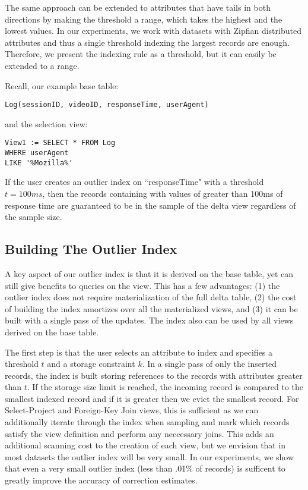 The same approach can be extended to attributes that have tails in both directions by making the threshold a range, which takes the highest and the lowest
values.
In our experiments, we work with datasets with Zipfian distributed attributes and thus a single threshold indexing the largest records are enough.
Therefore, we present the indexing rule as a threshold, but it can easily be extended to a range.

Recall, our example base table:
\begin{lstlisting}
Log(sessionID, videoID, responseTime, userAgent)
\end{lstlisting}
and the selection view:
\begin{lstlisting}
View1 := SELECT * FROM Log 
WHERE userAgent 
LIKE '%Mozilla%'
\end{lstlisting}
If the user creates an outlier index on ``responseTime" with a threshold $t=100ms$, then
the records containing with values of greater than 100ms of response time are guaranteed to be 
in the sample of the delta view regardless of the sample size.

\subsection{Building The Outlier Index}
A key aspect of our outlier index is that it is derived on the base table, yet 
can still give benefits to queries on the view.
This has a few advantages: (1) the outlier index does not require materialization of the full delta table,
(2) the cost of building the index amortizes over all the materialized views, and (3) it can be built with a 
single pass of the updates.
The index also can be used by all views derived on the base table.

The first step is that the user selects an attribute to index and specifies a threshold $t$ and a storage constraint $k$.
In a single pass of only the inserted records, the index is built storing references to the records with attributes greater than $t$.
If the storage size limit is reached, the incoming record is compared to the smallest indexed record and if it is greater then we evict the smallest record.
For Select-Project and Foreign-Key Join views, this is sufficient as we can additionally iterate through the index when sampling and mark 
which records satisfy the view definition and perform any neccessary joins. 
This adds an additional scanning cost to the creation of each view, but we envision that in most datasets the outlier index will be
very small.
In our experiments, we show that even a very small outlier index (less than .01\% of records) is sufficent to greatly improve the accuracy of
correction estimates.

